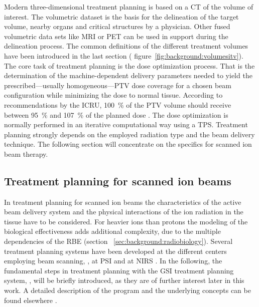 Modern three-dimensional treatment planning is based on a \ac{CT} of
the volume of interest. The volumetric dataset is the basis for the
delineation of the target volume, nearby organs and critical
structures by a physician. Other fused volumetric data sets like
\ac{MRI} or \ac{PET} can be used in support during the delineation
process. The common definitions of the different treatment volumes
have been introduced in the last section (\cf
figure~\vref{fig:background:volumesitv}). The core task of treatment
planning is the dose optimization process. That is the determination
of the machine-dependent delivery parameters needed to yield the
prescribed---usually homogeneous---\ac{PTV} dose coverage for a
chosen beam configuration while minimizing the dose to normal tissue.
According to recommendations by the \ac{ICRU}, \SI{100}{\%} of the
\ac{PTV} volume should receive between \SI{95}{\%} and \SI{107}{\%} of
the planned dose \citep{ICRU50}. The dose optimization is normally
performed in an iterative computational way using a
\ac{TPS}. Treatment planning strongly depends on the employed
radiation type and the beam delivery technique. The following section
will concentrate on the specifics for scanned ion beam therapy.

\subsection{Treatment planning for scanned ion beams}
\label{sec:background:TP}
In treatment planning for scanned ion beams the characteristics of the
active beam delivery system and the physical interactions of the ion
radiation in the tissue have to be considered. For heavier ions than
protons the modeling of the biological effectiveness adds additional
complexity, due to the multiple dependencies of the \ac{RBE} (section
~\ref{sec:background:radiobiology}). Several treatment planning
systems have been developed at the different centers employing beam
scanning, \eg, at \ac{PSI} \citep{Scheib1993} and at \ac{NIRS}
\citep{Inaniwa2008}. In the following, the fundamental steps in
treatment planning with the \ac{GSI} treatment planning system,
\TRiPNE, will be briefly introduced, as they are of further interest
later in this work.  A detailed description of the program and the
underlying concepts can be found elsewhere
\citep{Kraemer2000,Kraemer2000a}.

